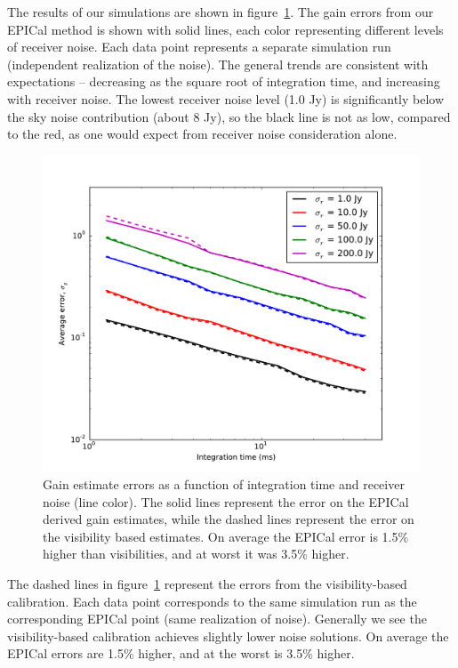 \documentclass[a4paper,fleqn,usenatbib]{../mnras}
\begin{document}
The results of our simulations are shown in figure~\ref{fig:noise}. The gain errors from our EPICal method is shown with solid lines, each color representing different levels of receiver noise. Each data point represents a separate simulation run (independent realization of the noise). The general trends are consistent with expectations -- decreasing as the square root of integration time, and increasing with receiver noise. The lowest receiver noise level (1.0 Jy) is significantly below the sky noise contribution (about 8 Jy), so the black line is not as low, compared to the red, as one would expect from receiver noise consideration alone.

\begin{figure}
\begin{center}
\includegraphics[width=\columnwidth]{figures/cal_paper_noise_med_sky.pdf}
\caption{Gain estimate errors as a function of integration time and receiver noise (line color). The solid lines represent the error on the EPICal derived gain estimates, while the dashed lines represent the error on the visibility based estimates. On average the EPICal error is 1.5\% higher than visibilities, and at worst it was 3.5\% higher.
}
\label{fig:noise}
\end{center}
\end{figure}

The dashed lines in figure~\ref{fig:noise} represent the errors from the visibility-based calibration. Each data point corresponds to the same simulation run as the corresponding EPICal point (same realization of noise). Generally we see the visibility-based calibration achieves slightly lower noise solutions. On average the EPICal errors are 1.5\% higher, and at the worst is 3.5\% higher. 
\end{document}
